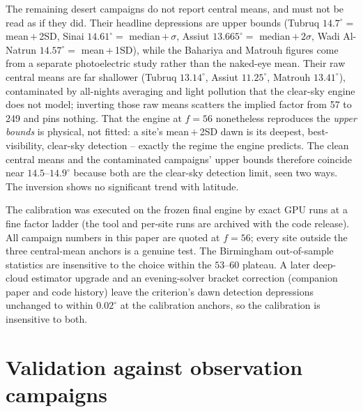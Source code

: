 \documentclass[preprint,12pt]{elsarticle}
\begin{document}
The remaining desert campaigns do not report central means, and must
not be read as if they did. Their headline depressions are upper bounds
(Tubruq $14.7^\circ =$ mean\,$+$\,2SD, Sinai $14.61^\circ =$
median\,$+\,\sigma$, Assiut $13.665^\circ =$ median\,$+\,2\sigma$, Wadi
Al-Natrun $14.57^\circ =$ mean\,$+$\,1SD), while the Bahariya and
Matrouh figures come from a separate photoelectric study rather than the
naked-eye mean. Their raw central means are far shallower (Tubruq
$13.14^\circ$, Assiut $11.25^\circ$, Matrouh $13.41^\circ$), contaminated
by all-nights averaging and light pollution that the clear-sky engine
does not model; inverting those raw means scatters the implied factor
from 57 to 249 and pins nothing. That the engine at $f = 56$ nonetheless
reproduces the \emph{upper bounds} is physical, not fitted: a site's
mean\,$+$\,2SD dawn is its deepest, best-visibility, clear-sky detection
-- exactly the regime the engine predicts. The clean central means and
the contaminated campaigns' upper bounds therefore coincide near
$14.5$--$14.9^\circ$ because both are the clear-sky detection limit,
seen two ways. The inversion shows no significant trend with latitude.

The calibration was executed on the frozen final engine by exact GPU
runs at a fine factor ladder (the tool and per-site runs are archived
with the code release). All campaign numbers in this paper are quoted at
$f = 56$; every site outside the three central-mean anchors is a genuine
test. The Birmingham out-of-sample statistics are insensitive to the
choice within the $53$--$60$ plateau. A later deep-cloud estimator
upgrade and an evening-solver bracket correction (companion paper and
code history) leave the criterion's dawn detection depressions unchanged
to within $0.02^{\circ}$ at the calibration anchors, so the calibration
is insensitive to both.

\section{Validation against observation campaigns}
\label{sec:campaigns}
\end{document}
